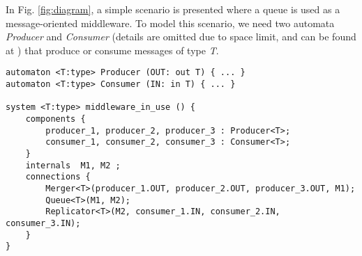 \begin{example} In Fig. \ref{fig:diagram}, a simple scenario is presented where a queue is used as a message-oriented middleware. To model this scenario, we need two automata \emph{Producer} and \emph{Consumer} (details are omitted due to space limit, and can be found at \cite{medmodels}) that produce or consume messages of type \emph{T}.
\begin{lstlisting}
automaton <T:type> Producer (OUT: out T) { ... }
automaton <T:type> Consumer (IN: in T) { ... }

system <T:type> middleware_in_use () {
    components {
        producer_1, producer_2, producer_3 : Producer<T>;
        consumer_1, consumer_2, consumer_3 : Consumer<T>;
    }
    internals  M1, M2 ;
    connections {
        Merger<T>(producer_1.OUT, producer_2.OUT, producer_3.OUT, M1);
        Queue<T>(M1, M2);
        Replicator<T>(M2, consumer_1.IN, consumer_2.IN, consumer_3.IN);
    }
}
\end{lstlisting}
\label{exp:middleware_system}
\end{example}